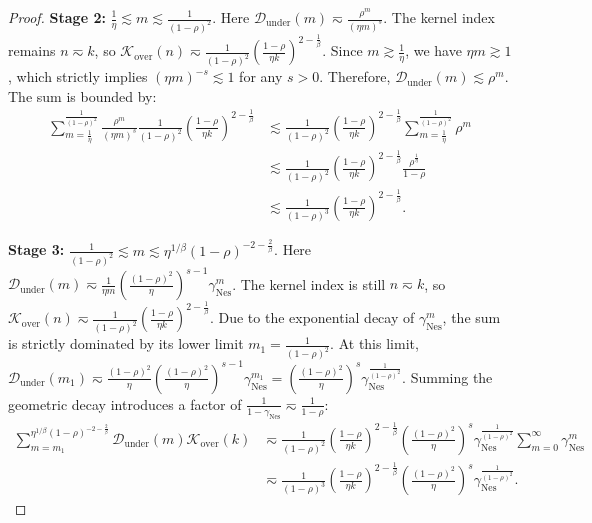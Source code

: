 \begin{proof}
\textbf{Stage 2:} $\frac{1}{\eta} \lesssim m \lesssim \frac{1}{(1-\rho)^2}$. 
Here $\mathcal{D}_{\mathrm{under}}(m) \eqsim \frac{\rho^m}{(\eta m)^s}$. The kernel index remains $n \eqsim k$, so $\mathcal{K}_{\mathrm{over}}(n) \eqsim \frac{1}{(1-\rho)^2} \left(\frac{1-\rho}{\eta k}\right)^{2-\frac{1}{\beta}}$. 
Since $m \gtrsim \frac{1}{\eta}$, we have $\eta m \gtrsim 1$, which strictly implies $(\eta m)^{-s} \lesssim 1$ for any $s > 0$. Therefore, $\mathcal{D}_{\mathrm{under}}(m) \lesssim \rho^m$. The sum is bounded by:
\begin{align*}
    \sum_{m=\frac{1}{\eta}}^{\frac{1}{(1-\rho)^2}} \frac{\rho^m}{(\eta m)^s} \frac{1}{(1-\rho)^2} \left(\frac{1-\rho}{\eta k}\right)^{2-\frac{1}{\beta}} 
    &\lesssim \frac{1}{(1-\rho)^2} \left(\frac{1-\rho}{\eta k}\right)^{2-\frac{1}{\beta}} \sum_{m=\frac{1}{\eta}}^{\frac{1}{(1-\rho)^2}} \rho^m \\
    &\lesssim \frac{1}{(1-\rho)^2} \left(\frac{1-\rho}{\eta k}\right)^{2-\frac{1}{\beta}} \frac{\rho^{\frac{1}{\eta}}}{1-\rho} \\
    &\lesssim \frac{1}{(1-\rho)^3} \left(\frac{1-\rho}{\eta k}\right)^{2-\frac{1}{\beta}}.
\end{align*}

\textbf{Stage 3:} $\frac{1}{(1-\rho)^2} \lesssim m \lesssim \eta^{1/\beta}(1-\rho)^{-2-\frac{2}{\beta}}$. 
Here $\mathcal{D}_{\mathrm{under}}(m) \eqsim \frac{1}{\eta m} \left(\frac{(1-\rho)^2}{\eta}\right)^{s-1} \gamma_{\mathrm{Nes}}^m$. The kernel index is still $n \eqsim k$, so $\mathcal{K}_{\mathrm{over}}(n) \eqsim \frac{1}{(1-\rho)^2} \left(\frac{1-\rho}{\eta k}\right)^{2-\frac{1}{\beta}}$. 
Due to the exponential decay of $\gamma_{\mathrm{Nes}}^m$, the sum is strictly dominated by its lower limit $m_1 = \frac{1}{(1-\rho)^2}$. At this limit, $\mathcal{D}_{\mathrm{under}}(m_1) \eqsim \frac{(1-\rho)^2}{\eta} \left(\frac{(1-\rho)^2}{\eta}\right)^{s-1} \gamma_{\mathrm{Nes}}^{m_1} = \left(\frac{(1-\rho)^2}{\eta}\right)^s \gamma_{\mathrm{Nes}}^{\frac{1}{(1-\rho)^2}}$. 
Summing the geometric decay introduces a factor of $\frac{1}{1-\gamma_{\mathrm{Nes}}} \eqsim \frac{1}{1-\rho}$:
\begin{align*}
    \sum_{m=m_1}^{\eta^{1/\beta}(1-\rho)^{-2-\frac{2}{\beta}}} \mathcal{D}_{\mathrm{under}}(m) \mathcal{K}_{\mathrm{over}}(k) 
    &\eqsim \frac{1}{(1-\rho)^2} \left(\frac{1-\rho}{\eta k}\right)^{2-\frac{1}{\beta}} \left(\frac{(1-\rho)^2}{\eta}\right)^s \gamma_{\mathrm{Nes}}^{\frac{1}{(1-\rho)^2}} \sum_{m=0}^{\infty} \gamma_{\mathrm{Nes}}^m \\
    &\eqsim \frac{1}{(1-\rho)^3} \left(\frac{1-\rho}{\eta k}\right)^{2-\frac{1}{\beta}} \left(\frac{(1-\rho)^2}{\eta}\right)^s \gamma_{\mathrm{Nes}}^{\frac{1}{(1-\rho)^2}}.
\end{align*}


\end{proof}
